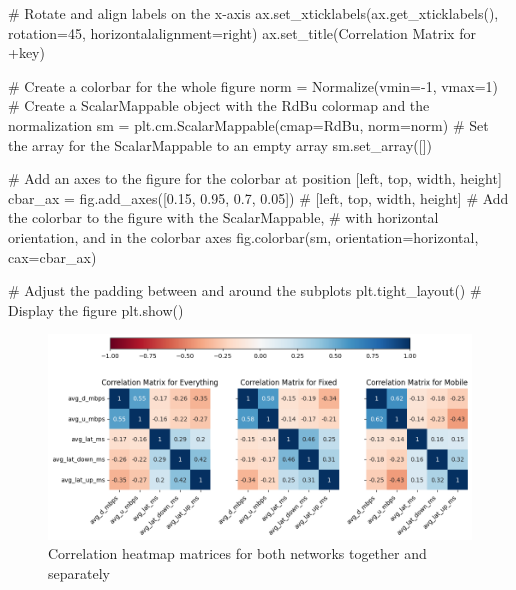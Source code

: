\documentclass[
  letterpaper,
  DIV=11,
  numbers=noendperiod,
  oneside]{scrartcl}
\newenvironment{Shaded}{\begin{snugshade}}{\end{snugshade}}
\newcommand{\CommentTok}[1]{\textcolor[rgb]{0.37,0.37,0.37}{#1}}
\newcommand{\DecValTok}[1]{\textcolor[rgb]{0.68,0.00,0.00}{#1}}
\newcommand{\FloatTok}[1]{\textcolor[rgb]{0.68,0.00,0.00}{#1}}
\newcommand{\NormalTok}[1]{\textcolor[rgb]{0.00,0.23,0.31}{#1}}
\newcommand{\OperatorTok}[1]{\textcolor[rgb]{0.37,0.37,0.37}{#1}}
\newcommand{\StringTok}[1]{\textcolor[rgb]{0.13,0.47,0.30}{#1}}
\begin{document}
\begin{Shaded}
\begin{Highlighting}[]
    \CommentTok{\# Rotate and align labels on the x{-}axis}
\NormalTok{    ax.set\_xticklabels(ax.get\_xticklabels(), rotation}\OperatorTok{=}\DecValTok{45}\NormalTok{, horizontalalignment}\OperatorTok{=}\StringTok{\textquotesingle{}right\textquotesingle{}}\NormalTok{)}
\NormalTok{    ax.set\_title(}\StringTok{\textquotesingle{}Correlation Matrix for \textquotesingle{}}\OperatorTok{+}\NormalTok{key)}

\CommentTok{\# Create a colorbar for the whole figure}
\NormalTok{norm }\OperatorTok{=}\NormalTok{ Normalize(vmin}\OperatorTok{={-}}\DecValTok{1}\NormalTok{, vmax}\OperatorTok{=}\DecValTok{1}\NormalTok{)}
\CommentTok{\# Create a ScalarMappable object with the \textquotesingle{}RdBu\textquotesingle{} colormap and the normalization}
\NormalTok{sm }\OperatorTok{=}\NormalTok{ plt.cm.ScalarMappable(cmap}\OperatorTok{=}\StringTok{\textquotesingle{}RdBu\textquotesingle{}}\NormalTok{, norm}\OperatorTok{=}\NormalTok{norm)}
\CommentTok{\# Set the array for the ScalarMappable to an empty array}
\NormalTok{sm.set\_array([])}

\CommentTok{\# Add an axes to the figure for the colorbar at position [left, top, width, height]}
\NormalTok{cbar\_ax }\OperatorTok{=}\NormalTok{ fig.add\_axes([}\FloatTok{0.15}\NormalTok{, }\FloatTok{0.95}\NormalTok{, }\FloatTok{0.7}\NormalTok{, }\FloatTok{0.05}\NormalTok{])  }\CommentTok{\# [left, top, width, height]}
\CommentTok{\# Add the colorbar to the figure with the ScalarMappable,}
\CommentTok{\# with horizontal orientation, and in the colorbar axes}
\NormalTok{fig.colorbar(sm, orientation}\OperatorTok{=}\StringTok{\textquotesingle{}horizontal\textquotesingle{}}\NormalTok{, cax}\OperatorTok{=}\NormalTok{cbar\_ax)}

\CommentTok{\# Adjust the padding between and around the subplots}
\NormalTok{plt.tight\_layout()}
\CommentTok{\# Display the figure}
\NormalTok{plt.show()}
\end{Highlighting}
\end{Shaded}

\begin{figure}[H]

{\centering \includegraphics{data-analytics_files/figure-latex/fig-orgheatmaps-output-1.png}

}

\caption{\label{fig-orgheatmaps}Correlation heatmap matrices for both
networks together and separately}

\end{figure}
\end{document}
